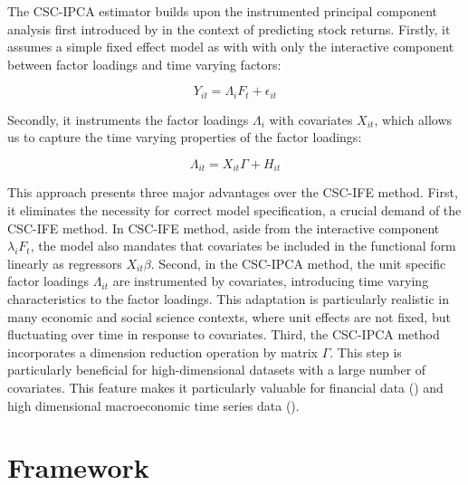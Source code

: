 \documentclass[12pt]{article}
\begin{document}
The CSC-IPCA estimator builds upon the instrumented principal component analysis first introduced by \cite{kelly2020instrumented, kelly2019characteristics} in the context of predicting stock returns. Firstly, it assumes a simple fixed effect model as with \cite{bai2003computation} with only the interactive component between factor loadings and time varying factors:

\begin{equation}
    Y_{it} = \Lambda_i F_t + \epsilon_{it}
\end{equation}

\noindent Secondly, it instruments the factor loadings $\Lambda_i$ with covariates $X_{it}$, which allows us to capture the time varying properties of the factor loadings:

\begin{equation}
    \Lambda_{it} = X_{it}\Gamma + H_{it}
\end{equation}

This approach presents three major advantages over the CSC-IFE method. First, it eliminates the necessity for correct model specification, a crucial demand of the CSC-IFE method. In CSC-IFE method, aside from the interactive component $\lambda_i F_t$, the model also mandates that covariates be included in the functional form linearly as regressors $X_{it}\beta$. Second, in the CSC-IPCA method, the unit specific factor loadings $\Lambda_{it}$ are instrumented by covariates, introducing time varying characteristics to the factor loadings. This adaptation is particularly realistic in many economic and social science contexts, where unit effects are not fixed, but fluctuating over time in response to covariates. Third, the CSC-IPCA method incorporates a dimension reduction operation by matrix $\Gamma$. This step is particularly beneficial for high-dimensional datasets with a large number of covariates. This feature makes it particularly valuable for financial data (\cite{feng2020taming}) and high dimensional macroeconomic time series data (\cite{brave2009chicago}).






 
\section{Framework} 
\label{sec: framework}
\end{document}
